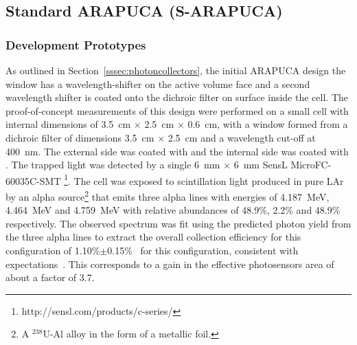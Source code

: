 \subsection{Standard ARAPUCA (S-ARAPUCA)}
\label{sec:sarapuca-prototypes}


\subsubsection{Development Prototypes}
\label{sec:valid-initial}

As outlined in Section~\ref{sssec:photoncollectors}, the initial ARAPUCA design the window has a wavelength-shifter on the \lar active volume face and a second wavelength shifter is coated onto the dichroic filter on surface inside the cell.  
The proof-of-concept measurements of this design were performed on a small cell with internal dimensions of \SI{3.5}{cm} $\times$ \SI{2.5}{cm} $\times$ \SI{0.6}{cm}, with a window formed from a dichroic filter of  dimensions \SI{3.5}{cm} $\times$ \SI{2.5}{cm} and a wavelength cut-off at \SI{400}{nm}. The external side was coated with  and the internal side was coated with . 
The trapped light was detected by a single \SI{6}{mm} $\times$ \SI{6}{mm} SensL MicroFC-60035C-SMT \footnote{http://sensl.com/products/c-series/}. The cell was exposed to scintillation light produced in pure LAr by an alpha source\footnote{A $^{238}$U-Al alloy in the form of a metallic foil.} that emits three alpha lines with energies of  \SI{4.187}{MeV}, \SI{4.464}{MeV} and \SI{4.759}{MeV} with relative abundances of 48.9\%, 2.2\% and 48.9\% respectively. 
The observed spectrum was fit using the predicted photon yield from the three alpha lines to extract the overall collection efficiency for this configuration of 1.10\%$\pm$0.15\%~\cite{Segreto:2018jdx} for this configuration, consistent with  expectations~\cite{Marinho:2018doi}. This corresponds to a gain in the effective photosensors area of about a factor of 3.7. 


